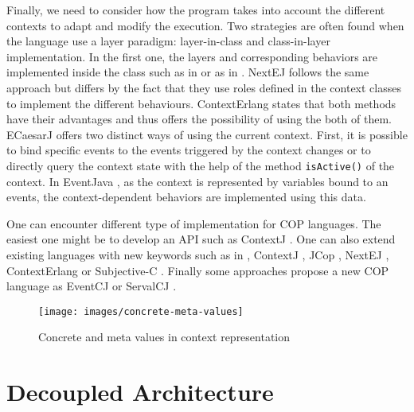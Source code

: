 \documentclass{sig-alternate}
\begin{document}
Finally, we need to consider how the program takes into account the different contexts to adapt and modify the execution. Two strategies are often found when the language use a layer paradigm: layer-in-class and class-in-layer implementation. In the first one, the layers and corresponding behaviors are implemented inside the class such as in \cite{appeltauer_improving_2009} \cite{appeltauer_declarative_2013} \cite{wasty_contextlua:_2010} or as in \cite{kamina_eventcj:_2011} \cite{kamina_unified_2013} \cite{Kamina:2015:GLA:2724525.2724570}. NextEJ \cite{kamina_towards_2009} follows the same approach but differs by the fact that they use roles defined in the context classes to implement the different behaviours. ContextErlang \cite{ghezzi_context_2010} states that both methods have their advantages and thus offers the possibility of using the both of them. ECaesarJ \cite{nunez_declarative_2009} offers two distinct ways of using the current context. First, it is possible to bind specific events to the events triggered by the context changes or to directly query the context state with the help of the method \lstinline|isActive()| of the context. In EventJava \cite{jayaram_context-oriented_2009}, as the context is represented by variables bound to an events, the context-dependent behaviors are implemented using this data.

One can encounter different type of implementation for COP languages. The easiest one might be to develop an API such as ContextJ \cite{appeltauer_improving_2009}. One can also extend existing languages with new keywords such as in \cite{clarke_semantics_2009}, ContextJ \cite{haupt_contextj:_2011}, JCop \cite{appeltauer_declarative_2013}, NextEJ \cite{kamina_towards_2009}, ContextErlang \cite{ghezzi_context_2010} or Subjective-C \cite{RELEASeD-2010-857551}. Finally some approaches propose a new COP language as EventCJ \cite{kamina_eventcj:_2011} or ServalCJ \cite{kamina_unified_2013} \cite{Kamina:2015:GLA:2724525.2724570}.
 
\begin{center}
\begin{figure}[!b]
\centering
\texttt{[image: images/concrete-meta-values]}
\caption{Concrete and meta values in context representation}
\label{figure:concretemetavalues}
\end{figure}
\end{center}

\section{Decoupled Architecture}
\label{architecture}
\end{document}
